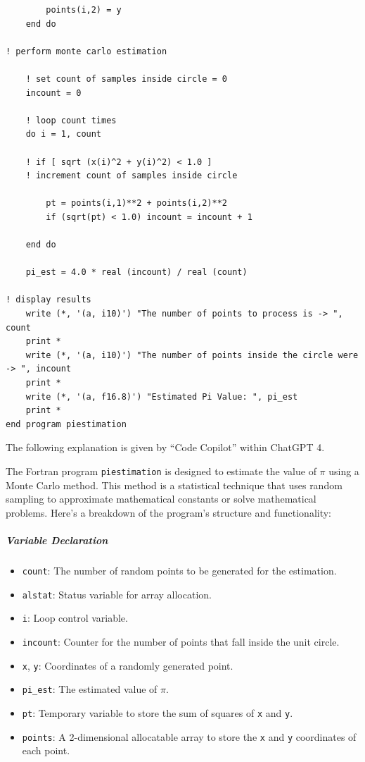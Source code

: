 \begin{verbatim}
        points(i,2) = y
    end do

! perform monte carlo estimation

    ! set count of samples inside circle = 0
    incount = 0

    ! loop count times
    do i = 1, count

    ! if [ sqrt (x(i)^2 + y(i)^2) < 1.0 ]
    ! increment count of samples inside circle

        pt = points(i,1)**2 + points(i,2)**2
        if (sqrt(pt) < 1.0) incount = incount + 1

    end do

    pi_est = 4.0 * real (incount) / real (count)

! display results
    write (*, '(a, i10)') "The number of points to process is -> ", count
    print *
    write (*, '(a, i10)') "The number of points inside the circle were -> ", incount
    print *
    write (*, '(a, f16.8)') "Estimated Pi Value: ", pi_est
    print *
end program piestimation
\end{verbatim}

The following explanation is given by ``Code Copilot'' within ChatGPT 4.

The Fortran program \texttt{piestimation} is designed to estimate the value of $\pi$ using a Monte Carlo method. This method is a statistical technique that uses random sampling to approximate mathematical constants or solve mathematical problems. Here's a breakdown of the program's structure and functionality:

\subparagraph{Variable Declaration}

\begin{itemize}
\item \texttt{count}: The number of random points to be generated for the estimation.
\item \texttt{alstat}: Status variable for array allocation.
\item \texttt{i}: Loop control variable.
\item \texttt{incount}: Counter for the number of points that fall inside the unit circle.
\item \texttt{x}, \texttt{y}: Coordinates of a randomly generated point.
\item \texttt{pi\_est}: The estimated value of $\pi$.
\item \texttt{pt}: Temporary variable to store the sum of squares of \texttt{x} and \texttt{y}.
\item \texttt{points}: A 2-dimensional allocatable array to store the \texttt{x} and \texttt{y} coordinates of each point.
\end{itemize}

